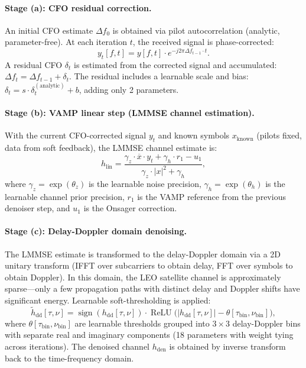 \documentclass{article}
\begin{document}
\paragraph{Stage (a): CFO residual correction.}
An initial CFO estimate $\Delta f_0$ is obtained via pilot autocorrelation (analytic, parameter-free). At each iteration $t$, the received signal is phase-corrected:
\begin{equation}
y_t[f, t] = y[f, t] \cdot e^{-j2\pi \Delta f_{t-1} \cdot t}.
\end{equation}
A residual CFO $\delta_t$ is estimated from the corrected signal and accumulated: $\Delta f_t = \Delta f_{t-1} + \delta_t$. The residual includes a learnable scale and bias: $\delta_t = s \cdot \delta_t^{\mathrm{(analytic)}} + b$, adding only 2 parameters.

\paragraph{Stage (b): VAMP linear step (LMMSE channel estimation).}
With the current CFO-corrected signal $y_t$ and known symbols $x_{\mathrm{known}}$ (pilots fixed, data from soft feedback), the LMMSE channel estimate is:
\begin{equation}
h_{\mathrm{lin}} = \frac{\gamma_z \cdot \overline{x} \cdot y_t + \gamma_h \cdot r_1 - u_1}{\gamma_z \cdot |x|^2 + \gamma_h},
\label{eq:lmmse}
\end{equation}
where $\gamma_z = \exp(\theta_z)$ is the learnable noise precision, $\gamma_h = \exp(\theta_h)$ is the learnable channel prior precision, $r_1$ is the VAMP reference from the previous denoiser step, and $u_1$ is the Onsager correction.

\paragraph{Stage (c): Delay-Doppler domain denoising.}
The LMMSE estimate is transformed to the delay-Doppler domain via a 2D unitary transform (IFFT over subcarriers to obtain delay, FFT over symbols to obtain Doppler). In this domain, the LEO satellite channel is approximately sparse---only a few propagation paths with distinct delay and Doppler shifts have significant energy. Learnable soft-thresholding is applied:
\begin{equation}
\tilde{h}_{\mathrm{dd}}[\tau, \nu] = \operatorname{sign}(h_{\mathrm{dd}}[\tau, \nu]) \cdot \operatorname{ReLU}\bigl(|h_{\mathrm{dd}}[\tau, \nu]| - \theta[\tau_{\mathrm{bin}}, \nu_{\mathrm{bin}}]\bigr),
\end{equation}
where $\theta[\tau_{\mathrm{bin}}, \nu_{\mathrm{bin}}]$ are learnable thresholds grouped into $3 \times 3$ delay-Doppler bins with separate real and imaginary components (18 parameters with weight tying across iterations). The denoised channel $h_{\mathrm{den}}$ is obtained by inverse transform back to the time-frequency domain.
\end{document}
